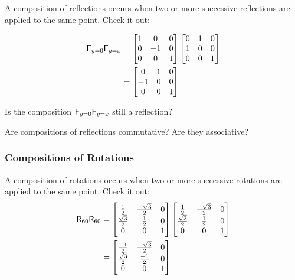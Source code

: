 A composition of reflections occurs when two or more successive
reflections are applied to the same point. Check it out:

\begin{align*}
\mathsf{F}_{y=0}\mathsf{F}_{y=x} &= \begin{bmatrix}
1 &  0 & 0\\
0 & -1 & 0\\
0 &  0 & 1
\end{bmatrix}
\begin{bmatrix}
0 & 1 & 0\\
1 & 0 & 0\\
0 & 0 & 1
\end{bmatrix}\\
&= \begin{bmatrix}
 0 & 1 & 0\\
-1 & 0 & 0\\
 0 & 0 & 1
\end{bmatrix}
\end{align*}


\begin{ques}
Is the composition $\mathsf{F}_{y=0}\mathsf{F}_{y=x}$ still a reflection?
\end{ques}
\QM

\begin{ques}
Are compositions of reflections commutative?  Are they
associative?
\end{ques}
\QM



\subsubsection{Compositions of Rotations}


A composition of rotations occurs when two or more successive
rotations are applied to the same point. Check it out: 
\begin{align*}
\mathsf{R}_{60}\mathsf{R}_{60} &= \begin{bmatrix}
\frac{1}{2} & \frac{-\sqrt{3}}{2} & 0\\
\frac{\sqrt{3}}{2} & \frac{1}{2} & 0\\
0 & 0 & 1
\end{bmatrix}
\begin{bmatrix}
\frac{1}{2} & \frac{-\sqrt{3}}{2} & 0\\
\frac{\sqrt{3}}{2} & \frac{1}{2} & 0\\
0 & 0 & 1
\end{bmatrix}\\
&= \begin{bmatrix}
\frac{-1}{2} & \frac{-\sqrt{3}}{2} & 0\\
\frac{\sqrt{3}}{2} & \frac{-1}{2} & 0\\
0 & 0 & 1
\end{bmatrix}
\end{align*}

